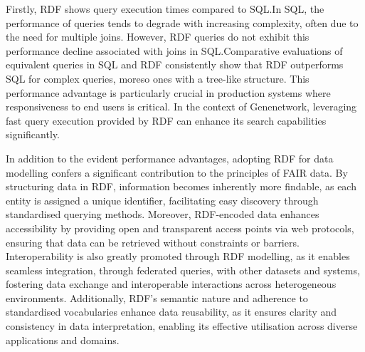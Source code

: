 Firstly, RDF shows query execution times compared to SQL.\@  In SQL, the performance of queries tends to degrade with increasing complexity, often due to the need for multiple joins.  However, RDF queries do not exhibit this performance decline associated with joins in SQL.\@  Comparative evaluations of equivalent queries in SQL and RDF consistently show that RDF outperforms SQL for complex queries, moreso ones with a tree-like structure.  This performance advantage is particularly crucial in production systems where responsiveness to end users is critical.  In the context of Genenetwork, leveraging fast query execution provided by RDF can enhance its search capabilities significantly.

In addition to the evident performance advantages, adopting RDF for data modelling confers a significant contribution to the principles of FAIR data.  By structuring data in RDF, information becomes inherently more findable, as each entity is assigned a unique identifier, facilitating easy discovery through standardised querying methods.  Moreover, RDF-encoded data enhances accessibility by providing open and transparent access points via web protocols, ensuring that data can be retrieved without constraints or barriers.  Interoperability is also greatly promoted through RDF modelling, as it enables seamless integration, through federated queries, with other datasets and systems, fostering data exchange and interoperable interactions across heterogeneous environments.  Additionally, RDF's semantic nature and adherence to standardised vocabularies enhance data reusability, as it ensures clarity and consistency in data interpretation, enabling its effective utilisation across diverse applications and domains.

